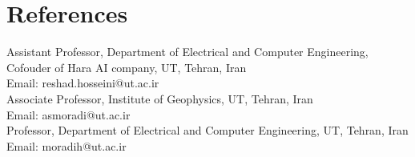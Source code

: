 \section{References}
  \vspace{2pt}
  \resumeSubHeadingListStart
    \small{\item{

        \textbf{}{ Assistant Professor, Department of Electrical and Computer Engineering, Cofouder of Hara AI company, UT, Tehran, Iran\\Email: reshad.hosseini@ut.ac.ir}\\ \vspace{3pt}
        \textbf{}{ Associate Professor, Institute of Geophysics, UT, Tehran, Iran\\Email: asmoradi@ut.ac.ir}\\ \vspace{3pt}
        \textbf{}{ Professor, Department of Electrical and Computer Engineering, UT, Tehran, Iran\\Email: moradih@ut.ac.ir}\\ \vspace{3pt}

}}
\resumeSubHeadingListEnd
